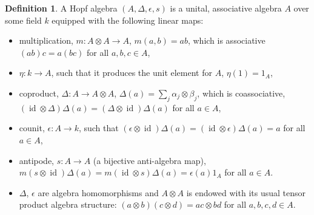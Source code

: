 \documentclass[10pt,a4paper]{amsart}
\numberwithin{equation}{section}
\theoremstyle{definition}
\newtheorem{defn}[thm]{Definition}
\newcommand{\id}{\operatorname{id}}
\def\mathcal#1{#1}%
\begin{document}
\begin{defn} A Hopf algebra $(\mathcal{A}, \Delta, \epsilon, s)$ is a unital, associative algebra $\mathcal{A}$ over some field $k$ equipped with the following linear maps:
\begin{itemize}\itemsep=0pt
\item multiplication, $m\colon \mathcal{A} \otimes \mathcal{A} \to \mathcal{A}$, $m(a,b) = ab$, which is associative $(ab)c = a (bc)$ for all $a,b,c \in \mathcal{A}$,
\item $\eta\colon k \to \mathcal{A}$, such that it produces the unit element for $\mathcal{A}$, $\eta(1) = 1_\mathcal{A}$,
\item coproduct, $\Delta\colon \mathcal{A} \to \mathcal{A} \otimes \mathcal{A}$, $\Delta(a) = \sum_j \alpha_j \otimes \beta_j$, which is coassociative, $(\id\otimes \Delta)\Delta(a) = (\Delta \otimes \id)\Delta(a)$ for all $a\in \mathcal{A}$,
\item counit, $\epsilon\colon \mathcal{A} \to k$, such that $(\epsilon \otimes \id)\Delta(a) = (\id \otimes \epsilon)\Delta(a)= a$ for all $a \in \mathcal{A}$,
\item antipode, $s\colon \mathcal{A} \to \mathcal{A}$ (a bijective anti-algebra map), $m (s \otimes \id)\Delta(a) = m(\id \otimes s) \Delta(a) = \epsilon(a) 1_\mathcal{A}$ for all $a \in \mathcal{A}$.
\item $\Delta$, $\epsilon$ are algebra homomorphisms and $\mathcal{A} \otimes \mathcal{A}$ is endowed with its
usual tensor product algebra structure: $(a \otimes b)(c \otimes d) = ac\otimes bd$ for all $a,b,c,d \in \mathcal{A}$.
\end{itemize}
\end{defn}
\end{document}
